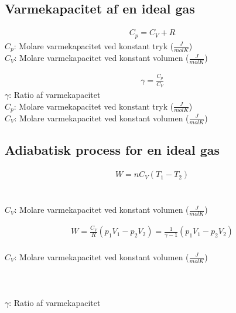 \subsection{Varmekapacitet af en ideal gas}
	\begin{align}
		C_p=C_V+R
	\end{align}
	$C_p$: Molare varmekapacitet ved konstant tryk ($\frac{J}{mol K}$)\\
	$C_V$: Molare varmekapacitet ved konstant volumen ($\frac{J}{mol K}$)\\
	\idealgaskonst

	\begin{align}
		\gamma=\frac{C_p}{C_V}
	\end{align}
	$\gamma$: Ratio af varmekapacitet\\
	$C_p$: Molare varmekapacitet ved konstant tryk ($\frac{J}{mol K}$)\\
	$C_V$: Molare varmekapacitet ved konstant volumen ($\frac{J}{mol K}$)

\subsection{Adiabatisk process for en ideal gas}
	\begin{align}
		W=nC_V(T_1-T_2)
	\end{align}
	\arbejde\\
	\mol\\
	$C_V$: Molare varmekapacitet ved konstant volumen ($\frac{J}{mol K}$)\\
	\tempk

	\begin{align}
		W=\frac{C_V}{R}(p_1V_1-p_2V_2)=\frac{1}{\gamma-1}(p_1V_1-p_2V_2)
	\end{align}
	\arbejde\\
	$C_V$: Molare varmekapacitet ved konstant volumen ($\frac{J}{mol K}$)\\
	\idealgaskonst\\
	\tryk\\
	\volumen\\
	$\gamma$: Ratio af varmekapacitet